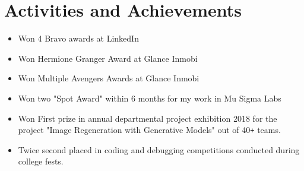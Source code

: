 \documentclass[10pt]{article}
\begin{document}
\section*{Activities and Achievements}
\begin{itemize}
 \itemsep0em
 \item Won 4 Bravo awards at LinkedIn
 \item Won Hermione Granger Award at Glance Inmobi
 \item Won Multiple Avengers Awards at Glance Inmobi
 \item Won two "Spot Award" within 6 months for my work in Mu Sigma Labs
 \item 
 Won First prize in annual departmental project exhibition 2018 for the project "Image Regeneration with Generative Models" out of 40\texttt{+} teams.
 \item 
 Twice second placed in coding and debugging competitions conducted during college fests.
\end{itemize}
\end{document}
